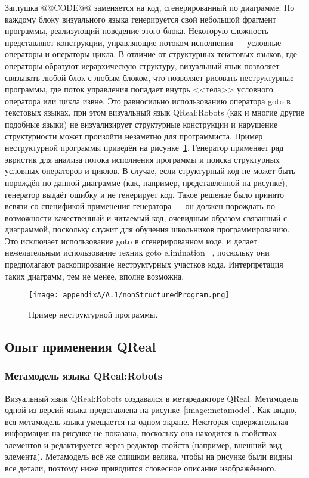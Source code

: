 Заглушка @@CODE@@ заменяется на код, сгенерированный по диаграмме. По каждому блоку 
визуального языка генерируется свой небольшой фрагмент программы, реализующий поведение 
этого блока. Некоторую сложность представляют конструкции, управляющие потоком исполнения 
--- условные операторы и операторы цикла. В отличие от структурных текстовых языков, 
где операторы образуют иерархическую структуру, визуальный язык позволяет связывать 
любой блок с любым блоком, что позволяет рисовать неструктурные программы, где поток 
управления попадает внутрь <<тела>> условного оператора или цикла извне. Это равносильно 
использованию оператора goto в текстовых языках, при этом визуальный язык QReal:Robots 
(как и многие другие подобные языки) не визуализирует структурные конструкции и нарушение 
структурности может произойти незаметно для программиста. Пример неструктурной программы 
приведён на рисунке~\ref{image:nonStructuredProgram}. Генератор применяет ряд эвристик 
для анализа потока исполнения программы и поиска структурных условных операторов и 
циклов. В случае, если структурный код не может быть порождён по данной диаграмме 
(как, например, представленной на рисунке), генератор выдаёт ошибку и не генерирует 
код. Такое решение было принято всвязи со спецификой применения генератора --- он 
должен порождать по возможности качественный и читаемый код, очевидным образом связанный 
с диаграммой, поскольку служит для обучения школьников программированию. Это исключает
использование goto в сгенерированном коде, и делает нежелательным использование техник goto elimination%
~\cite{terekhov2000reengineering}, поскольку они предполагают раскопирование неструктурных 
участков кода. Интерпретация таких диаграмм, тем не менее, вполне возможна.

\begin{figure} [ht]
	\begin{center}
		\texttt{[image: appendixA/A.1/nonStructuredProgram.png]}
		\caption{Пример неструктурной программы.}
		\label{image:nonStructuredProgram}
	\end{center}
\end{figure}

\subsection{Опыт применения QReal}
\subsubsection{Метамодель языка QReal:Robots}
Визуальный язык QReal:Robots создавался в метаредакторе QReal. Метамодель одной из 
версий языка представлена на рисунке~\ref{image:metamodel}. Как видно, вся метамодель 
языка умещается на одном экране. Некоторая содержательная информация на рисунке не 
показана, поскольку она находится в свойствах элементов и редактируется через редактор 
свойств (например, внешний вид элемента). Метамодель всё же слишком велика, чтобы на 
рисунке были видны все детали, поэтому ниже приводится словесное описание изображённого.

